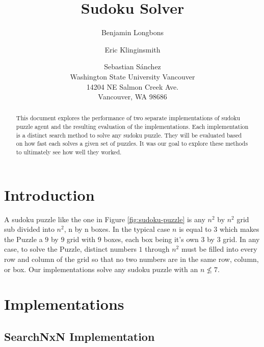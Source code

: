 \documentclass[letterpaper]{article}
\begin{document}
\title{Sudoku Solver}
\author{
	Benjamin Longbons\and
    Eric Klinginsmith \and 
    Sebastian S\'{a}nchez \\
Washington State University Vancouver \\
14204 NE Salmon Creek Ave. \\
Vancouver, WA 98686
}

\maketitle
\begin{abstract}
This document explores the performance of two separate implementations of sudoku puzzle agent and the resulting evaluation of the implementations. Each implementation is a distinct search method to solve any sudoku puzzle. They will be evaluated based on how fast each solves a given set of puzzles. It was our goal to explore these methods to ultimately see how well they worked.
\end{abstract}

\section{Introduction}

A sudoku puzzle like the one in Figure \ref{fig:sudoku-puzzle} is any $ n^{2} $ by $ n^{2} $ grid sub divided into $ n^{2} $, n by n boxes. In the typical case $ n $ is equal to $3$ which makes the Puzzle a $9$ by $9$ grid with $9$ boxes, each box being it's own $3$ by $3$ grid. In any case, to solve the Puzzle, distinct numbers $1$ through $ n^{2} $ must be filled into every row and column of the grid so that no two numbers are in the same row, column, or box. Our implementations solve any sudoku puzzle with an $n \not\le 7$.

\section{Implementations}

\subsection{SearchNxN Implementation}
\end{document}
